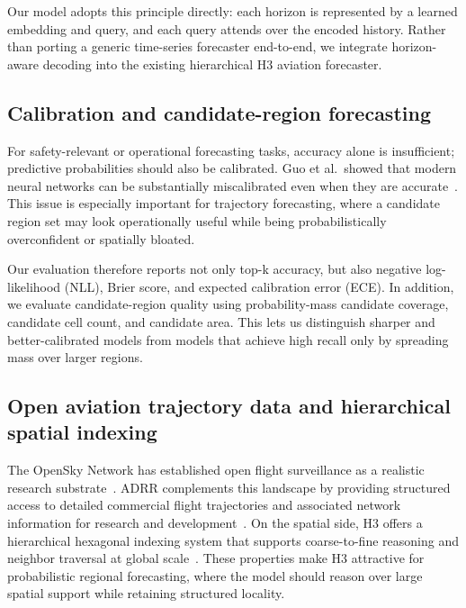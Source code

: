 Our model adopts this principle directly: each horizon is represented by a learned embedding and query, and each query attends over the encoded history. Rather than porting a generic time-series forecaster end-to-end, we integrate horizon-aware decoding into the existing hierarchical H3 aviation forecaster.

\subsection{Calibration and candidate-region forecasting}

For safety-relevant or operational forecasting tasks, accuracy alone is insufficient; predictive probabilities should also be calibrated. Guo et al.~showed that modern neural networks can be substantially miscalibrated even when they are accurate~\cite{guo2017calibration}. This issue is especially important for trajectory forecasting, where a candidate region set may look operationally useful while being probabilistically overconfident or spatially bloated.

Our evaluation therefore reports not only top-k accuracy, but also negative log-likelihood (NLL), Brier score, and expected calibration error (ECE). In addition, we evaluate candidate-region quality using probability-mass candidate coverage, candidate cell count, and candidate area. This lets us distinguish sharper and better-calibrated models from models that achieve high recall only by spreading mass over larger regions.

\subsection{Open aviation trajectory data and hierarchical spatial indexing}

The OpenSky Network has established open flight surveillance as a realistic research substrate~\cite{opensky2014,strohmeier2021crowdsourced}. ADRR complements this landscape by providing structured access to detailed commercial flight trajectories and associated network information for research and development~\cite{eurocontrol_adrr_2025}. On the spatial side, H3 offers a hierarchical hexagonal indexing system that supports coarse-to-fine reasoning and neighbor traversal at global scale~\cite{h3docs2025}. These properties make H3 attractive for probabilistic regional forecasting, where the model should reason over large spatial support while retaining structured locality.
